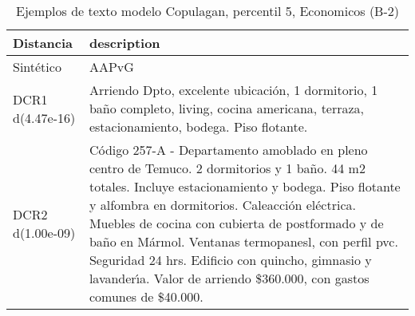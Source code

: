 \begin{table}[H]
\centering
\fontsize{10}{14}\selectfont
\caption{Ejemplos de texto modelo Copulagan, percentil 5, Economicos (B-2)}
\label{table-example-economicos-b-2-copulagan-5p-text}
\begin{tabular}{|l|m{35em}|}
\hline
\rowcolor[gray]{0.8}
Distancia & description \\
\hline Sintético & AAPvG \\
\hline DCR1 d(4.47e-16) & Arriendo Dpto, excelente ubicaci\'on, 1 dormitorio, 1 ba\~no completo, living, cocina americana, terraza, estacionamiento, bodega. Piso flotante.   \\
\hline DCR2 d(1.00e-09) & C\'odigo 257-A - Departamento amoblado en pleno centro de Temuco. 2 dormitorios y 1 ba\~no. 44 m2 totales. Incluye estacionamiento y bodega. Piso flotante y alfombra en dormitorios. Caleacci\'on el\'ectrica. Muebles de cocina con cubierta de postformado y de ba\~no en M\'armol. Ventanas termopanesl, con perfil pvc. Seguridad 24 hrs. Edificio con quincho, gimnasio y lavander{\'\i}a. Valor de arriendo \$360.000, con gastos comunes de \$40.000. \\
\hline
\end{tabular}
\end{table}

